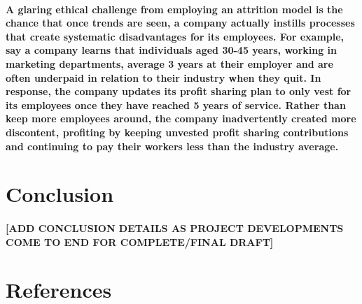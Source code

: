 \documentclass{article}
\begin{document}
\paragraph{A glaring ethical challenge from employing an attrition model is the chance that once trends are seen, a company actually instills processes that create systematic disadvantages for its employees. For example, say a company learns that individuals aged 30-45 years, working in marketing departments, average 3 years at their employer and are often underpaid in relation to their industry when they quit. In response, the company updates its profit sharing plan to only vest for its employees once they have reached 5 years of service. Rather than keep more employees around, the company inadvertently created more discontent, profiting by keeping unvested profit sharing contributions and continuing to pay their workers less than the industry average.}

\section{Conclusion}

\paragraph{[ADD CONCLUSION DETAILS AS PROJECT DEVELOPMENTS COME TO END FOR COMPLETE/FINAL DRAFT]}
 
\section{References}

\printbibliography
\end{document}
